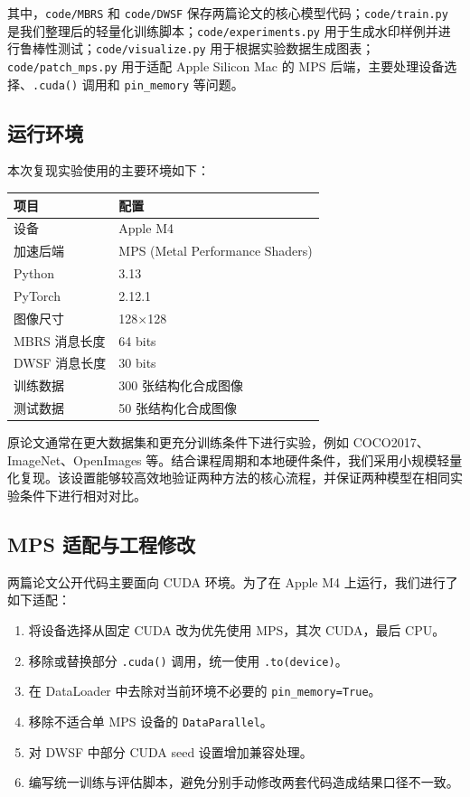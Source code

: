 ﻿\documentclass[UTF8,zihao=5]{ctexart}
\begin{document}
其中，\texttt{code/MBRS} 和 \texttt{code/DWSF} 保存两篇论文的核心模型代码；\texttt{code/train.py} 是我们整理后的轻量化训练脚本；\texttt{code/experiments.py} 用于生成水印样例并进行鲁棒性测试；\texttt{code/visualize.py} 用于根据实验数据生成图表；\texttt{code/patch\_mps.py} 用于适配 Apple Silicon Mac 的 MPS 后端，主要处理设备选择、\texttt{.cuda()} 调用和 \texttt{pin\_memory} 等问题。

\subsection{运行环境}

本次复现实验使用的主要环境如下：

\begin{table}[H]
\centering
\small
\begin{tabular}{p{}p{}}
\toprule
项目 & 配置 \\
\midrule
设备 & Apple M4 \\
加速后端 & MPS (Metal Performance Shaders) \\
Python & 3.13 \\
PyTorch & 2.12.1 \\
图像尺寸 & 128×128 \\
MBRS 消息长度 & 64 bits \\
DWSF 消息长度 & 30 bits \\
训练数据 & 300 张结构化合成图像 \\
测试数据 & 50 张结构化合成图像 \\
\bottomrule
\end{tabular}
\end{table}

原论文通常在更大数据集和更充分训练条件下进行实验，例如 COCO2017、ImageNet、OpenImages 等。结合课程周期和本地硬件条件，我们采用小规模轻量化复现。该设置能够较高效地验证两种方法的核心流程，并保证两种模型在相同实验条件下进行相对对比。

\subsection{MPS 适配与工程修改}

两篇论文公开代码主要面向 CUDA 环境。为了在 Apple M4 上运行，我们进行了如下适配：

\begin{enumerate}
\item 将设备选择从固定 CUDA 改为优先使用 MPS，其次 CUDA，最后 CPU。
\item 移除或替换部分 \texttt{.cuda()} 调用，统一使用 \texttt{.to(device)}。
\item 在 DataLoader 中去除对当前环境不必要的 \texttt{pin\_memory=True}。
\item 移除不适合单 MPS 设备的 \texttt{DataParallel}。
\item 对 DWSF 中部分 CUDA seed 设置增加兼容处理。
\item 编写统一训练与评估脚本，避免分别手动修改两套代码造成结果口径不一致。
\end{enumerate}
\end{document}
